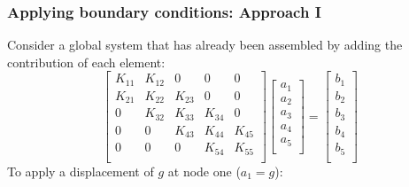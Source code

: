 \documentclass[notes]{beamer}
\begin{document}


\begin{frame}
\frametitle{Applying boundary conditions: Approach I}
Consider a global system that has already been assembled by adding the contribution of
each element:
\begin{equation*}
	\begin{bmatrix}
		K_{11} & K_{12} & 0 & 0 & 0 \\
		K_{21} & K_{22} & K_{23} & 0 & 0 \\
		0 & K_{32} & K_{33} & K_{34} & 0 \\
		0 & 0 & K_{43} & K_{44} & K_{45} \\
		0 & 0 & 0  &  K_{54} & K_{55}\\
	\end{bmatrix} %
	\begin{bmatrix}
		a_1 \\
		a_2 \\
		a_3 \\
		a_4 \\
		a_5 \\
	\end{bmatrix} =  %
	\begin{bmatrix}
		b_1 \\
		b_2 \\
		b_3 \\
		b_4 \\
		b_5 \\
	\end{bmatrix}
\end{equation*}
To apply a displacement of $g$ at node one ($a_1 = g$):


\end{frame}
\end{document}
